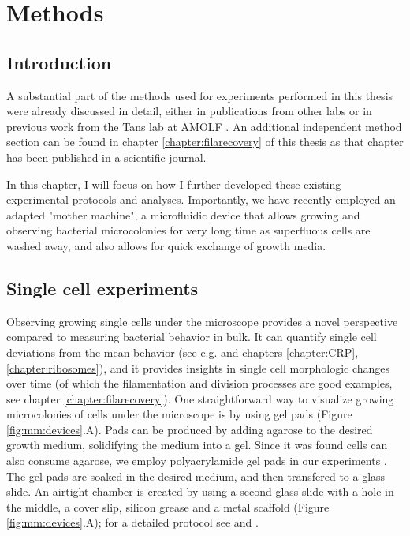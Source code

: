 



% 


\chapter{Methods}


\section{Introduction}

A substantial part of the methods used for experiments performed in this thesis were already discussed in detail, either in publications from other labs \cite{Dunlop2008,Young2012} or in previous work from the Tans lab at AMOLF \cite{Kiviet2010, Walker2016t, Gude2016}. An additional independent method section can be found in chapter \ref{chapter:filarecovery} of this thesis as that chapter has been published in a scientific journal. %

In this chapter, I will focus on how I further developed these existing experimental protocols and analyses. %
Importantly, we have recently employed an adapted "mother machine", a microfluidic device that allows growing and observing bacterial microcolonies for very long time as superfluous cells are washed away, and also allows for quick exchange of growth media.

\section{Single cell experiments}

Observing growing single cells under the microscope provides a novel perspective compared to measuring bacterial behavior in bulk.
It can quantify single cell deviations from the mean behavior (see e.g. \cite{Elowitz2002, Kiviet2014} and chapters \ref{chapter:CRP}, \ref{chapter:ribosomes}), and it provides insights in single cell morphologic changes over time (of which the filamentation and division processes are good examples, see chapter \ref{chapter:filarecovery}).
%
One straightforward way to visualize growing microcolonies of cells under the microscope is by using gel pads \cite{Elowitz2002, Dunlop2008, Dong2010, Kiviet2010, Young2012, Kiviet2014} (Figure \ref{fig:mm:devices}.A).
Pads can be produced by adding agarose to the desired growth medium, solidifying the medium into a gel.
Since it was found cells can also consume agarose, we employ polyacrylamide gel pads in our experiments \cite{Kiviet2010}. The gel pads are soaked in the desired medium, and then transfered to a glass slide. An airtight chamber is created by using a second glass slide with a hole in the middle, a cover slip, silicon grease and a metal scaffold (Figure \ref{fig:mm:devices}.A); for a detailed protocol see \cite{Walker2016t} and \cite{Young2012}.


